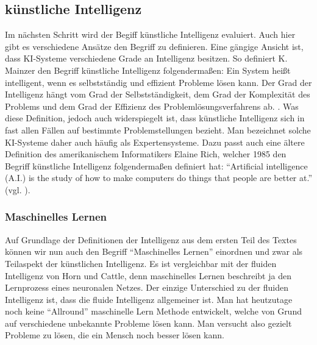 \documentclass[a4paper, 11pt]{scrartcl}
\begin{document}
 \subsection{künstliche Intelligenz}
Im nächsten Schritt wird der Begiff künstliche Intelligenz evaluiert. Auch hier gibt es verschiedene Ansätze den Begriff zu definieren. Eine gängige Ansicht ist, dass KI-Systeme verschiedene Grade an Intelligenz besitzen. So definiert K. Mainzer den Begriff künstliche Intelligenz folgendermaßen: Ein System heißt intelligent, wenn es selbstständig und effizient Probleme lösen kann. Der Grad der Intelligenz hängt vom Grad der Selbstständigkeit, dem Grad der Komplexität des Problems und dem Grad der Effizienz des Problemlösungsverfahrens ab. \cite{Mainzer2003}. Was diese Definition, jedoch auch widerspiegelt ist, dass künstliche Intelligenz sich in fast allen Fällen auf bestimmte Problemstellungen bezieht. Man bezeichnet solche KI-Systeme daher auch häufig als Expertensysteme. Dazu passt auch eine ältere Definition des amerikanischem Informatikers Elaine Rich, welcher 1985 den Begriff künstliche Intelligenz folgendermaßen definiert hat: ``Artificial intelligence (A.I.) is the study of how to make computers do things that people are better at.'' (vgl. \cite{Rich1985}).

\subsubsection{Maschinelles Lernen}
Auf Grundlage der Definitionen der Intelligenz aus dem ersten Teil des Textes können wir nun auch den Begriff ``Maschinelles Lernen'' einordnen und zwar als Teilaspekt der künstlichen Intelligenz. Es ist vergleichbar mit der fluiden Intelligenz von Horn und Cattle, denn maschinelles Lernen beschreibt ja den Lernprozess eines neuronalen Netzes. Der einzige Unterschied zu der fluiden Intelligenz ist, dass die fluide Intelligenz allgemeiner ist. Man hat heutzutage noch keine ``Allround'' maschinelle Lern Methode entwickelt, welche von Grund auf verschiedene unbekannte Probleme lösen kann. Man versucht also gezielt Probleme zu lösen, die ein Mensch noch besser lösen kann.
\end{document}
